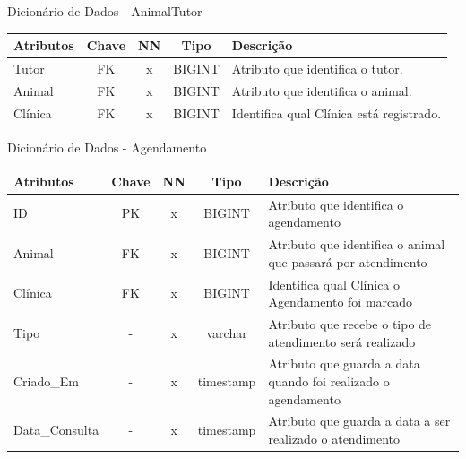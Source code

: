 \documentclass[
    12pt,               %
    openright,          %
    oneside,
    a4paper,            %
    BIBLATEX,           %
    TODO,               %
    english,            %
    brazil              %
    ]{ifsp-spo-inf-ctds}
\begin{document}
    \begin{center}
      \begin{quadro}[H]
      \centering
          \caption{Dicionário de Dados - AnimalTutor}
          \begin{tabulary}{1.0\textwidth}{|p{9em}|c|c|c|p{19em}|}
        \hline
        Atributos & Chave & NN & Tipo & Descrição\\
        \hline
        Tutor & FK & x & BIGINT & Atributo que identifica o tutor. \\
        \hline
        Animal & FK & x & BIGINT & Atributo que identifica o animal.\\
        \hline
        Clínica & FK & x & BIGINT & Identifica qual Clínica está registrado.\\
        \hline
        \end{tabulary}
         
          \label{qd: md-animaltutor}
      \end{quadro}
    \end{center}
    
    \begin{center}
      \begin{quadro}[H]
      \centering
          \caption{Dicionário de Dados - Agendamento}
          \begin{tabulary}{1.0\textwidth}{|p{9em}|c|c|c|p{19em}|}
        \hline
        Atributos & Chave & NN & Tipo & Descrição\\
        \hline
        ID & PK & x & BIGINT & Atributo que identifica o agendamento \\
        \hline
        Animal & FK & x & BIGINT & Atributo que identifica o animal que passará por atendimento \\
        \hline
        Clínica & FK & x & BIGINT & Identifica qual Clínica o Agendamento foi marcado\\
        \hline
        Tipo & - & x & varchar & Atributo que recebe o tipo de atendimento será realizado \\
        \hline
        Criado\_Em & - & x & timestamp & Atributo que guarda a data quando foi realizado o agendamento\\
        \hline
        Data\_Consulta & - & x & timestamp & Atributo que guarda a data a ser realizado o atendimento \\
        \hline
        \end{tabulary}
         
          \label{qd: md-agendamento}
      \end{quadro}
    \end{center}
    
\end{document}
